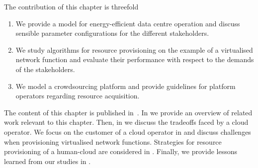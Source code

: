 The contribution of this chapter is threefold
\begin{enumerate}
\item We provide a model for energy-efficient data centre operation and discuss sensible parameter configurations for the different stakeholders.
\item We study algorithms for resource provisioning on the example of a virtualised network function and evaluate their performance with respect to the demands of the stakeholders.
\item We model a crowdsourcing platform and provide guidelines for platform operators regarding resource acquisition.
\end{enumerate}

The content of this chapter is published in~\cite{Schwartz2012a,Metzger2014a,Schwartz2015}.
In  we provide an overview of related work relevant to this chapter.
Then, in  we discuss the tradeoffs faced by a cloud operator.
We focus on the customer of a cloud operator in  and discuss challenges when provisioning virtualised network functions.
Strategies for resource provisioning of a human-cloud are considered in .
Finally, we provide lessons learned from our studies in .







